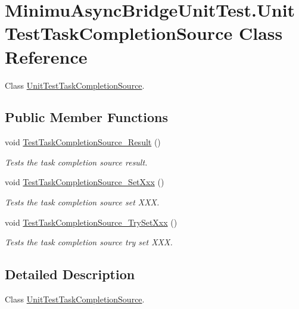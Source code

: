 \hypertarget{class_minimu_async_bridge_unit_test_1_1_unit_test_task_completion_source}{}\section{Minimu\+Async\+Bridge\+Unit\+Test.\+Unit\+Test\+Task\+Completion\+Source Class Reference}
\label{class_minimu_async_bridge_unit_test_1_1_unit_test_task_completion_source}


Class \hyperlink{class_minimu_async_bridge_unit_test_1_1_unit_test_task_completion_source}{Unit\+Test\+Task\+Completion\+Source}.  


\subsection*{Public Member Functions}
\begin{DoxyCompactItemize}
\item 
void \hyperlink{class_minimu_async_bridge_unit_test_1_1_unit_test_task_completion_source_a73b5fe2c512266ccc060074cf23c553d}{Test\+Task\+Completion\+Source\+\_\+\+Result} ()
\begin{DoxyCompactList}\small\item\em Tests the task completion source result. \end{DoxyCompactList}\item 
void \hyperlink{class_minimu_async_bridge_unit_test_1_1_unit_test_task_completion_source_afaab0886bf548c5cd5173ef84e3913ac}{Test\+Task\+Completion\+Source\+\_\+\+Set\+Xxx} ()
\begin{DoxyCompactList}\small\item\em Tests the task completion source set X\+XX. \end{DoxyCompactList}\item 
void \hyperlink{class_minimu_async_bridge_unit_test_1_1_unit_test_task_completion_source_ab9b0c4fd85ed08adcae235ddae7a6a92}{Test\+Task\+Completion\+Source\+\_\+\+Try\+Set\+Xxx} ()
\begin{DoxyCompactList}\small\item\em Tests the task completion source try set X\+XX. \end{DoxyCompactList}\end{DoxyCompactItemize}


\subsection{Detailed Description}
Class \hyperlink{class_minimu_async_bridge_unit_test_1_1_unit_test_task_completion_source}{Unit\+Test\+Task\+Completion\+Source}. 




